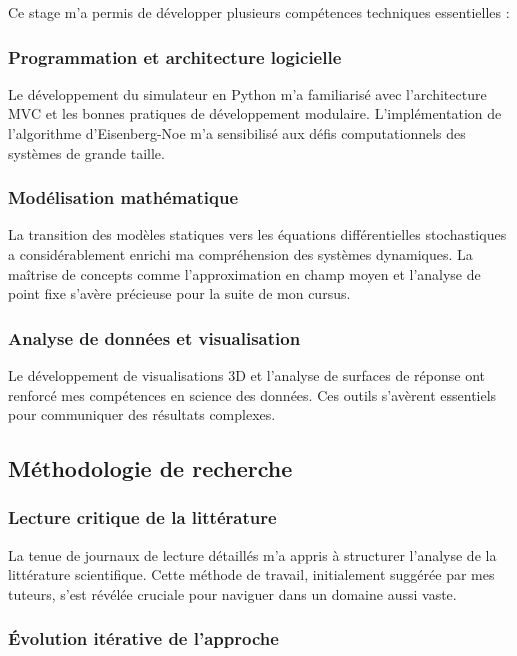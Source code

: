 \documentclass[12pt,a4paper,twoside]{article}
\begin{document}
Ce stage m'a permis de développer plusieurs compétences techniques essentielles :

\subsubsection{Programmation et architecture logicielle}

Le développement du simulateur en Python m'a familiarisé avec l'architecture MVC et les bonnes pratiques de développement modulaire. L'implémentation de l'algorithme d'Eisenberg-Noe m'a sensibilisé aux défis computationnels des systèmes de grande taille.

\subsubsection{Modélisation mathématique}

La transition des modèles statiques vers les équations différentielles stochastiques a considérablement enrichi ma compréhension des systèmes dynamiques. La maîtrise de concepts comme l'approximation en champ moyen et l'analyse de point fixe s'avère précieuse pour la suite de mon cursus.

\subsubsection{Analyse de données et visualisation}

Le développement de visualisations 3D et l'analyse de surfaces de réponse ont renforcé mes compétences en science des données. Ces outils s'avèrent essentiels pour communiquer des résultats complexes.

\subsection{Méthodologie de recherche}

\subsubsection{Lecture critique de la littérature}

La tenue de journaux de lecture détaillés m'a appris à structurer l'analyse de la littérature scientifique. Cette méthode de travail, initialement suggérée par mes tuteurs, s'est révélée cruciale pour naviguer dans un domaine aussi vaste.

\subsubsection{Évolution itérative de l'approche}
\end{document}
